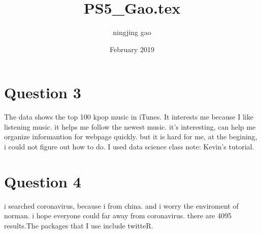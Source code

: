 \documentclass{article}
\title{PS5_Gao.tex}
\author{ningjing gao }
\date{February 2019}
\begin{document}
\maketitle

\section{Question 3}


The data shows the top 100 kpop music in iTunes. 
It interests me because I like listening music. it helps me follow the newest music. it's interesting, can help me organize informantion for webpage quickly. but it is hard for me, at the begining, i could not figure out how to do.
I used data science class note: Kevin's tutorial.



\section{Question 4}

i searched coronavirus, because i from china. and i worry the enviroment of norman. i hope everyone could far away from coronavirus. there are 4095 results.The packages that I use include twitteR.
\end{document}
